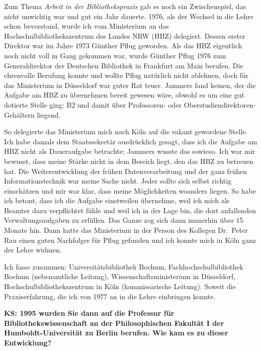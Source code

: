 \documentclass[a4paper,
fontsize=11pt,
oneside,
numbers=noperiodatend,
parskip=half-,
bibliography=totoc,
final
]{scrartcl}
\begin{document}
Zum Thema \emph{Arbeit in der Bibliothekspraxis} gab es noch ein
Zwischenspiel, das nicht unwichtig war und gut ein Jahr dauerte. 1976,
als der Wechsel in die Lehre schon bevorstand, wurde ich vom Ministerium
an das Hochschulbibliothekszentrum des Landes NRW (HBZ) delegiert.
Dessen erster Direktor war im Jahre 1973 Günther Pflug geworden. Als das
HBZ eigentlich noch nicht voll in Gang gekommen war, wurde Günther Pflug
1976 zum Generaldirektor der Deutschen Bibliothek in Frankfurt am Main
berufen. Die ehrenvolle Berufung konnte und wollte Pflug natürlich nicht
ablehnen, doch für das Ministerium in Düsseldorf war guter Rat teuer.
Jammers fand keinen, der die Aufgabe am HBZ zu übernehmen bereit gewesen
wäre, obwohl es um eine gut dotierte Stelle ging: B2 und damit über
Professoren- oder Oberstudiendirektoren-Gehältern liegend.

So delegierte das Ministerium mich nach Köln auf die vakant gewordene
Stelle. Ich habe damals dem Staatssekretär ausdrücklich gesagt, dass ich
die Aufgabe am HBZ nicht als Daueraufgabe betrachte; Jammers wusste das
sowieso. Ich war mir bewusst, dass meine Stärke nicht in dem Bereich
liegt, den das HBZ zu betreuen hat. Die Weiterentwicklung der frühen
Datenverarbeitung und der ganz frühen Informationstechnik war meine
Sache nicht. Jeder sollte sich selbst richtig einschätzen und mir war
klar, dass meine Möglichkeiten woanders liegen. So habe ich betont, dass
ich die Aufgabe einstweilen übernehme, weil ich mich als Beamter dazu
verpflichtet fühle und weil ich in der Lage bin, die dort anfallenden
Verwaltungsaufgaben zu erfüllen. Das Ganze zog sich dann immerhin über
15 Monate hin. Dann hatte das Ministerium in der Person des Kollegen
Dr.~Peter Rau einen guten Nachfolger für Pflug gefunden und ich konnte
mich in Köln ganz der Lehre widmen.

Ich fasse zusammen: Universitätsbibliothek Bochum,
Fachhochschulbibliothek Bochum (nebenamtliche Leitung),
Wissenschaftsministerium in Düsseldorf, Hochschulbibliothekszentrum in
Köln (kommissarische Leitung). Soweit die Praxiserfahrung, die ich von
1977 an in die Lehre einbringen konnte.

\textbf{KS: 1995 wurden Sie dann auf die Professur für
Bibliothekswissenschaft an der Philosophischen Fakultät I der
Humboldt-Universität zu Berlin berufen. Wie kam es zu dieser
Entwicklung?}
\end{document}
